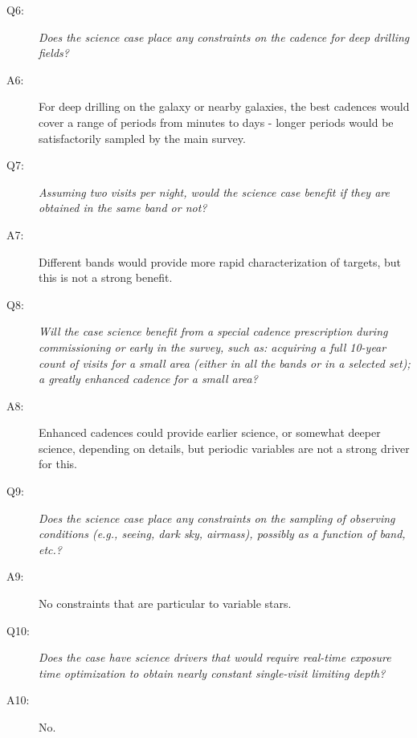 \begin{description}
 \item[Q6:] {\it Does the science case place any constraints on the
 cadence for deep drilling fields?}

 \item[A6:] For deep drilling on the galaxy or nearby galaxies, the best cadences would cover a range of periods from
minutes to days - longer periods would be satisfactorily sampled by the main survey.

 \item[Q7:] {\it Assuming two visits per night, would the science case
 benefit if they are obtained in the same band or not?}

 \item[A7:] Different bands would provide more rapid characterization of targets, but this is not a strong benefit.

 \item[Q8:] {\it Will the case science benefit from a special cadence
 prescription during commissioning or early in the survey, such as:
 acquiring a full 10-year count of visits for a small area (either in all
 the bands or in a  selected set); a greatly enhanced cadence for a small
 area?}

 \item[A8:] Enhanced cadences could provide earlier science, or somewhat deeper science, depending on details, but 
periodic variables are not a strong driver for this.

 \item[Q9:] {\it Does the science case place any constraints on the
 sampling of observing conditions (e.g., seeing, dark sky, airmass),
 possibly as a function of band, etc.?}

 \item[A9:] No constraints that are particular to variable stars.

 \item[Q10:] {\it Does the case have science drivers that would require
 real-time exposure time optimization to obtain nearly constant
 single-visit limiting depth?}

 \item[A10:] No.

 \end{description}


\navigationbar
